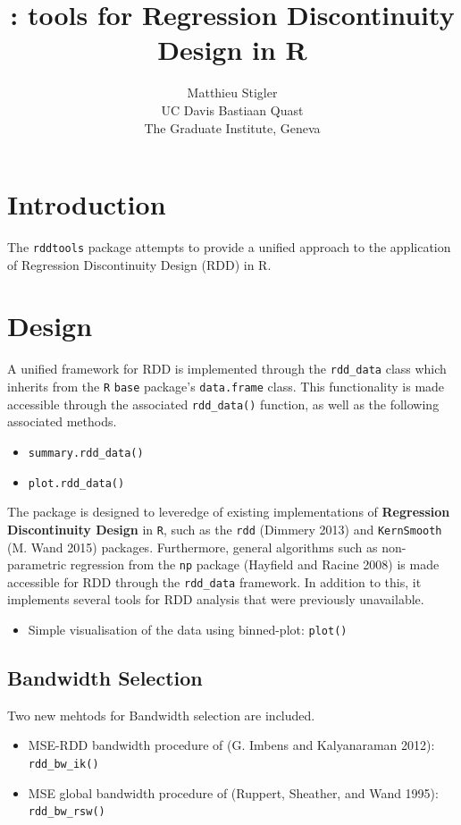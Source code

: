 \documentclass[article]{jss}
\author{
Matthieu Stigler\\UC Davis \And Bastiaan Quast\\The Graduate Institute, Geneva
}
\title{\pkg{rddtools}: tools for Regression Discontinuity Design in R}
\begin{document}
\section{Introduction}\label{introduction}

The \texttt{rddtools} package attempts to provide a unified approach to
the application of Regression Discontinuity Design (RDD) in R.

\section{Design}\label{design}

A unified framework for RDD is implemented through the
\texttt{rdd\_data} class which inherits from the \texttt{R}
\texttt{base} package's \texttt{data.frame} class. This functionality is
made accessible through the associated \texttt{rdd\_data()} function, as
well as the following associated methods.

\begin{itemize}
\itemsep1pt\parskip0pt
\item
  \texttt{summary.rdd\_data()}
\item
  \texttt{plot.rdd\_data()}
\end{itemize}

The package is designed to leveredge of existing implementations of
\textbf{Regression Discontinuity Design} in \texttt{R}, such as the
\texttt{rdd} (Dimmery 2013) and \texttt{KernSmooth} (M. Wand 2015)
packages. Furthermore, general algorithms such as non-parametric
regression from the \texttt{np} package (Hayfield and Racine 2008) is
made accessible for RDD through the \texttt{rdd\_data} framework. In
addition to this, it implements several tools for RDD analysis that were
previously unavailable.

\begin{itemize}
\itemsep1pt\parskip0pt
\item
  Simple visualisation of the data using binned-plot: \texttt{plot()}
\end{itemize}

\subsection{Bandwidth Selection}\label{bandwidth-selection}

Two new mehtods for Bandwidth selection are included.

\begin{itemize}
\itemsep1pt\parskip0pt
\item
  MSE-RDD bandwidth procedure of (G. Imbens and Kalyanaraman 2012):
  \texttt{rdd\_bw\_ik()}
\item
  MSE global bandwidth procedure of (Ruppert, Sheather, and Wand 1995):
  \texttt{rdd\_bw\_rsw()}
\end{itemize}
\end{document}

